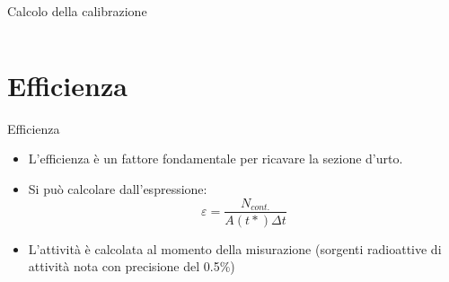\documentclass [xcolor=svgnames, 9pt] {beamer}
\begin{document}
\begin{frame}{Calcolo della calibrazione}
\begin{columns}
\begin{column}{0.47\textwidth}
		\end{column}
	\end{columns}
\end{frame}%

\section{Efficienza}
\begin{frame}{Efficienza}
	\begin{itemize}
		\item L'efficienza è un fattore fondamentale per ricavare la sezione d'urto.
		\item Si può calcolare dall'espressione:
		\begin{equation}
			\varepsilon = \dfrac{N_{cont.}}{A(t*) \Delta t}
		\end{equation}
		\item L'attività è calcolata al momento della misurazione (sorgenti radioattive di attività nota con precisione del 0.5\%) %
	\end{itemize}
	
	\vspace{0.5cm}
	

\end{frame}
\end{document}
